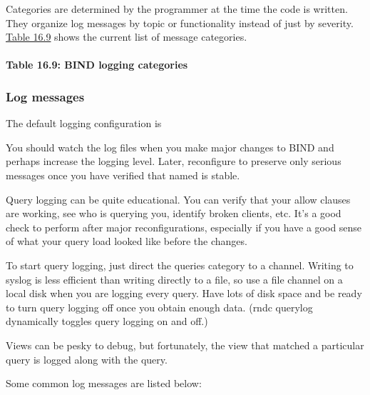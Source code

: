 Categories are determined by the programmer at the time the code is
written. They organize log messages by topic or functionality instead of
just by severity.
\protect\hyperlink{part0024_split_070.htmlux5cux23_idTextAnchor960}{Table
16.9} shows the current list of message categories.

\paragraph[{Table 16.9: }BIND logging categories]{\texorpdfstring{{Table
16.9:
}\protect\hypertarget{part0024_split_070.htmlux5cux23_idTextAnchor960}{}{}BIND
logging
categories\protect\hypertarget{part0024_split_070.htmlux5cux23_idIndexMarker2287}{}{}}{Table 16.9: BIND logging categories}}


\subsubsection[Log
messages]{\texorpdfstring{\protect\hypertarget{part0024_split_070.htmlux5cux23_idTextAnchor961}{}{}Log
messages}{Log messages}}

The default logging configuration is


You should watch the log files when you make major changes to BIND and
perhaps increase the logging level. Later, reconfigure to preserve only
serious messages once you have verified that {named} is stable.

Query logging can be quite educational. You can verify that your {allow}
clauses are working, see who is querying you, identify broken clients,
etc. It's a good check to perform after major reconfigurations,
especially if you have a good sense of what your query load looked like
before the changes.

To start query logging, just direct the {queries} category to a channel.
Writing to syslog is less efficient than writing directly to a file, so
use a file channel on a local disk when you are logging every query.
Have lots of disk space and be ready to turn query logging off once you
obtain enough data. ({rndc querylog} dynamically toggles query logging
on and off.)

Views can be pesky to debug, but fortunately, the view that matched a
particular query is logged along with the query.

Some common log messages are listed below:

